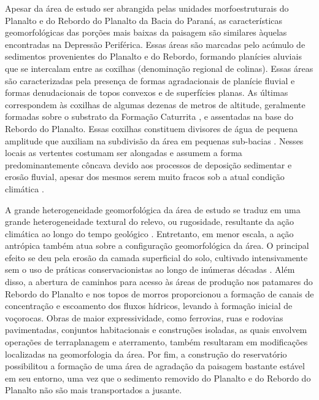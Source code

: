 
Apesar da área de estudo ser abrangida pelas unidades morfoestruturais do Planalto e do Rebordo do Planalto
da Bacia do Paraná, as características geomorfológicas das porções mais baixas da paisagem são similares 
àquelas encontradas na Depressão Periférica. Essas áreas são marcadas pelo acúmulo de sedimentos provenientes 
do Planalto e do Rebordo, formando planícies aluviais que se intercalam entre as coxilhas (denominação 
regional de colinas). Essas áreas são caracterizadas pela presença de formas agradacionais de planície fluvial 
e formas denudacionais de topos convexos e de superfícies planas. As últimas correspondem às coxilhas de 
algumas dezenas de metros de altitude, geralmente formadas sobre o substrato da Formação Caturrita 
\cite{GasparettoEtAl1988}, e assentadas na base do Rebordo do Planalto. Essas coxilhas constituem 
divisores de água de pequena amplitude que auxiliam na subdivisão da área em pequenas sub-bacias 
\cite{Marins2004, Sartori2009}. Nesses locais as vertentes costumam ser alongadas e assumem a forma 
predominantemente côncava devido aos processos de deposição sedimentar e erosão fluvial, apesar dos mesmos 
serem muito fracos sob a atual condição climática 
\cite{NascimentoEtAl2010, WerlangEtAl2010}.

A grande heterogeneidade geomorfológica da área de estudo se traduz em uma grande heterogeneidade textural 
do relevo, ou rugosidade, resultante da ação climática ao longo do tempo geológico \cite{NascimentoEtAl2010}. 
Entretanto, em menor escala, a ação antrópica também atua sobre a configuração geomorfológica da área. O 
principal efeito se deu pela erosão da camada superficial do solo, cultivado intensivamente sem o uso de 
práticas conservacionistas ao longo de inúmeras décadas \cite{Menezes2008, Sturmer2008, Miguel2010, 
SamuelRosaEtAl2011a}. Além disso, a abertura de caminhos para acesso às áreas de produção nos patamares do 
Rebordo do Planalto e nos topos de morros proporcionou a formação de canais de concentração e escoamento dos 
fluxos hídricos, levando à formação inicial de voçorocas. Obras de maior expressividade, como ferrovias, ruas 
e rodovias pavimentadas, conjuntos habitacionais e construções isoladas, as quais envolvem operações de 
terraplanagem e aterramento, também resultaram em modificações localizadas na geomorfologia da área. Por fim, 
a construção do reservatório possibilitou a formação de uma área de agradação da paisagem bastante estável em 
seu entorno, uma vez que o sedimento removido do Planalto e do Rebordo do Planalto não são mais transportados 
a jusante.

